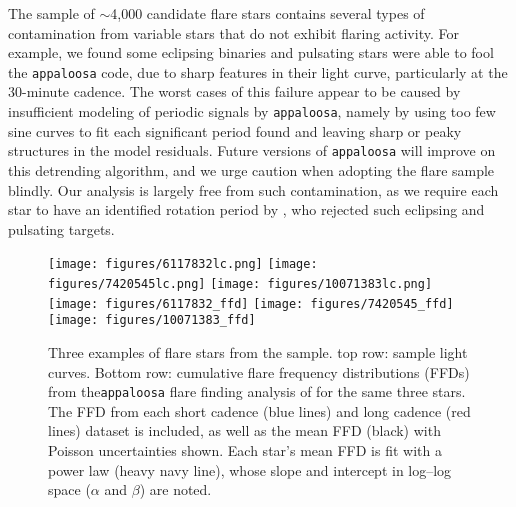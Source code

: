 \documentclass[preprint2]{aastex62}
\begin{document}
The \citet{davenport2016} sample of $\sim$4,000 candidate flare stars contains several types of contamination from variable stars that do not exhibit flaring activity. For example, we found some eclipsing binaries and pulsating stars were able to fool the {\tt appaloosa} code, due to sharp features in their light curve, particularly at the 30-minute cadence. The worst cases of this failure appear to be caused by insufficient modeling of periodic signals by {\tt appaloosa}, namely by using too few sine curves to fit each significant period found and leaving sharp or peaky structures in the model residuals. Future versions of {\tt appaloosa} will improve on this detrending algorithm, and we urge caution when adopting the \citet{davenport2016} flare sample blindly. Our analysis is largely free from such contamination, as we require each star to have an identified rotation period by \citet{mcquillan2014}, who rejected such eclipsing and pulsating targets.


\begin{figure*}[!t]
\centering
\texttt{[image: figures/6117832lc.png]}
\texttt{[image: figures/7420545lc.png]}
\texttt{[image: figures/10071383lc.png]}\\
\texttt{[image: figures/6117832\_ffd]}
\texttt{[image: figures/7420545\_ffd]}
\texttt{[image: figures/10071383\_ffd]}
\caption{
Three examples of flare stars from the \citet{davenport2016} sample. top row: sample light curves. Bottom row: cumulative flare frequency distributions (FFDs) from the{\tt appaloosa} flare finding analysis of \citet{davenport2016} for the same three stars. The FFD from each short cadence (blue lines) and long cadence (red lines) dataset is included, as well as the mean FFD (black) with Poisson uncertainties shown. Each star's mean FFD is fit with a power law (heavy navy line), whose slope and intercept in log--log space ($\alpha$ and $\beta$) are noted.
}
\label{fig:ffd1}
\end{figure*}



\end{document}
